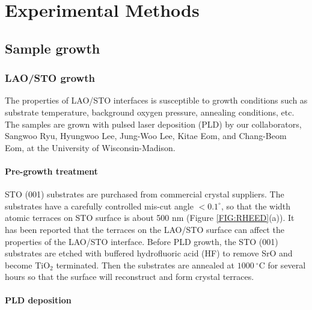 \documentclass[pdflatex, sectionletters, 12pt]{pittetd}    %
\begin{document}
\chapter{Experimental Methods}
\label{SEC:methods}

\section{Sample growth}

\subsection{LAO/STO growth}
The properties of LAO/STO interfaces is susceptible to growth conditions such as substrate temperature, background oxygen pressure, annealing conditions, etc\cite{cancellieri2010influence}. The samples are grown with pulsed laser deposition (PLD)\cite{bark2011tailoring} by our collaborators, Sangwoo Ryu, Hyungwoo Lee, Jung-Woo Lee, Kitae Eom, and Chang-Beom Eom, at the University of Wisconsin-Madison.

\subsubsection{Pre-growth treatment}

STO (001) substrates are purchased from commercial crystal suppliers. The substrates have a carefully controlled mis-cut angle $< 0.1^{\circ}$, so that the width atomic terraces on STO surface is about 500 nm (Figure \ref{FIG:RHEED}(a)). It has been reported that the terraces on the LAO/STO surface can affect the properties of the LAO/STO interface\cite{fix2011influence}. Before PLD growth, the STO (001) substrates are etched with buffered hydrofluoric acid (HF) to remove SrO and become TiO$_2$ terminated. Then the substrates are annealed at $1000 \ ^{\circ}$C for several hours so that the surface will reconstruct and form crystal terraces\cite{radovic2008low}. 

\subsubsection{PLD deposition}
\end{document}
